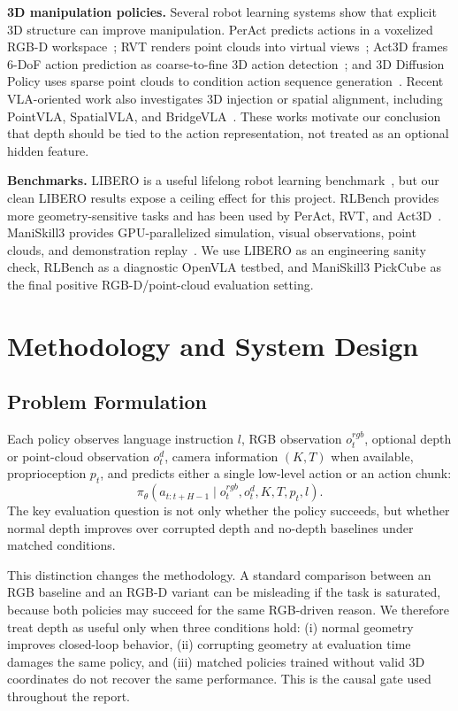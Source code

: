 \documentclass[conference]{IEEEtran}
\begin{document}
\textbf{3D manipulation policies.}
Several robot learning systems show that explicit 3D structure can improve manipulation. PerAct predicts actions in a voxelized RGB-D workspace~\citep{shridhar2023peract}; RVT renders point clouds into virtual views~\citep{goyal2023rvt}; Act3D frames 6-DoF action prediction as coarse-to-fine 3D action detection~\citep{gervet2023act3d}; and 3D Diffusion Policy uses sparse point clouds to condition action sequence generation~\citep{ze20243d}. Recent VLA-oriented work also investigates 3D injection or spatial alignment, including PointVLA, SpatialVLA, and BridgeVLA~\citep{li2026pointvla,qu2025spatialvla,li2025bridgevla}. These works motivate our conclusion that depth should be tied to the action representation, not treated as an optional hidden feature.

\textbf{Benchmarks.}
LIBERO is a useful lifelong robot learning benchmark~\citep{liu2023libero}, but our clean LIBERO results expose a ceiling effect for this project. RLBench provides more geometry-sensitive tasks and has been used by PerAct, RVT, and Act3D~\citep{james2020rlbench}. ManiSkill3 provides GPU-parallelized simulation, visual observations, point clouds, and demonstration replay~\citep{tao2024maniskill3}. We use LIBERO as an engineering sanity check, RLBench as a diagnostic OpenVLA testbed, and ManiSkill3 PickCube as the final positive RGB-D/point-cloud evaluation setting.

\section{Methodology and System Design}

\subsection{Problem Formulation}

Each policy observes language instruction $l$, RGB observation $o_t^{rgb}$, optional depth or point-cloud observation $o_t^{d}$, camera information $(K,T)$ when available, proprioception $p_t$, and predicts either a single low-level action or an action chunk:
\begin{equation}
    \pi_\theta(a_{t:t+H-1} \mid o_t^{rgb}, o_t^d, K, T, p_t, l).
\end{equation}
The key evaluation question is not only whether the policy succeeds, but whether normal depth improves over corrupted depth and no-depth baselines under matched conditions.

This distinction changes the methodology. A standard comparison between an RGB baseline and an RGB-D variant can be misleading if the task is saturated, because both policies may succeed for the same RGB-driven reason. We therefore treat depth as useful only when three conditions hold: (i) normal geometry improves closed-loop behavior, (ii) corrupting geometry at evaluation time damages the same policy, and (iii) matched policies trained without valid 3D coordinates do not recover the same performance. This is the causal gate used throughout the report.
\end{document}
